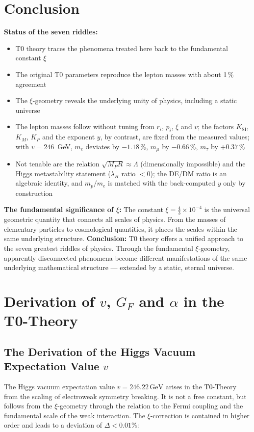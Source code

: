 		\section{Conclusion}
	\textbf{Status of the seven riddles:}
	\begin{itemize}
		\item T0 theory traces the phenomena treated here back to the fundamental constant $\xi$
		\item The original T0 parameters reproduce the lepton masses with about 1\,\% agreement
		\item The $\xi$-geometry reveals the underlying unity of physics, including a static universe
		\item The lepton masses follow without tuning from $r_i$, $p_i$, $\xi$ and $v$; the factors $K_{\text{SI}}$, $K_M$, $K_P$ and the exponent $y$, by contrast, are fixed from the measured values; with $v = 246$~GeV, $m_e$ deviates by $-1.18\,\%$, $m_\mu$ by $-0.66\,\%$, $m_\tau$ by $+0.37\,\%$
		\item Not tenable are the relation $\sqrt{M_P R} \approx \Lambda$ (dimensionally impossible) and the Higgs metastability statement ($\lambda_H$ ratio $< 0$); the DE/DM ratio is an algebraic identity, and $m_p/m_e$ is matched with the back-computed $y$ only by construction
	\end{itemize}
	\textbf{The fundamental significance of $\xi$:}
	The constant $\xi = \frac{4}{3} \times 10^{-4}$ is the universal geometric quantity that connects all scales of physics. From the masses of elementary particles to cosmological quantities, it places the scales within the same underlying structure.
	\vspace{1cm}
	\noindent\textbf{Conclusion:} T0 theory offers a unified approach to the seven greatest riddles of physics. Through the fundamental $\xi$-geometry, apparently disconnected phenomena become different manifestations of the same underlying mathematical structure --- extended by a static, eternal universe.
	\appendix
	\section{Derivation of $v$, $G_F$ and $\alpha$ in the T0-Theory}
	\subsection{The Derivation of the Higgs Vacuum Expectation Value $v$}
	The Higgs vacuum expectation value $v = 246.22\,\si{\giga\electronvolt}$ arises in the T0-Theory from the scaling of electroweak symmetry breaking. It is not a free constant, but follows from the $\xi$-geometry through the relation to the Fermi coupling and the fundamental scale of the weak interaction. The $\xi$-correction is contained in higher order and leads to a deviation of $\Delta < 0.01\%$:
	
